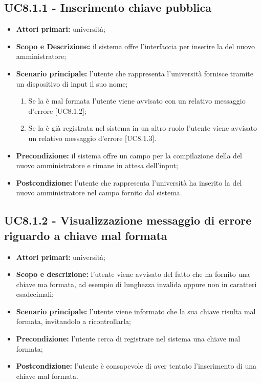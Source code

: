 \documentclass[AnalisiDeiRequisiti.tex]{subfiles}
\begin{document}
\subsection{UC8.1.1 - Inserimento chiave pubblica}
\begin{itemize}
	\item \textbf{Attori primari:} università;
	\item \textbf{Scopo e Descrizione:} il sistema offre l'interfaccia per inserire la  del nuovo amministratore;
	\item \textbf{Scenario principale:} l'utente che rappresenta l'università fornisce tramite un dispositivo di input il suo nome;	\begin{enumerate}
		\item Se la  è mal formata l'utente viene avvisato con un relativo messaggio d'errore [UC8.1.2];
		\item Se la  è già registrata nel sistema in un altro ruolo l'utente viene avvisato un relativo messaggio d'errore [UC8.1.3].
	\end{enumerate}
	\item \textbf{Precondizione:} il sistema offre un campo per la compilazione della  del nuovo amministratore e rimane in attesa dell'input;
	\item \textbf{Postcondizione:} l'utente che rappresenta l'università ha inserito la  del nuovo amministratore nel campo fornito dal sistema.
\end{itemize}
\subsection{UC8.1.2 - Visualizzazione messaggio di errore riguardo a chiave mal formata}
\begin{itemize}
	\item \textbf{Attori primari:} università;
	\item \textbf{Scopo e descrizione:} l'utente viene avvisato del fatto che ha fornito una chiave ma formata, ad esempio di lunghezza invalida oppure non in caratteri esadecimali;
	\item \textbf{Scenario principale:} l'utente viene informato che la sua chiave risulta mal formata, invitandolo a ricontrollarla;
	\item \textbf{Precondizione:} l'utente cerca di registrare nel sistema una chiave mal formata;
	\item \textbf{Postcondizione:} l'utente è consapevole di aver tentato l'inserimento di una chiave mal formata.
\end{itemize}
\end{document}
